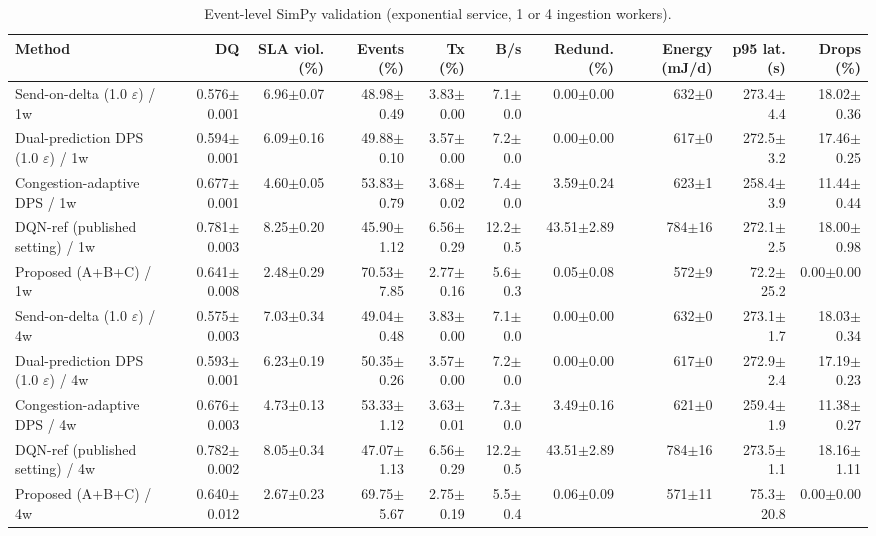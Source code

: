 \begin{table}[t]
\centering
\caption{Event-level SimPy validation (exponential service, 1 or 4 ingestion workers).}
\label{tab:simpy}
\footnotesize
\begin{tabular}{lrrrrrrrrr}
\toprule
Method & DQ & SLA viol. (\%) & Events (\%) & Tx (\%) & B/s & Redund. (\%) & Energy (mJ/d) & p95 lat. (s) & Drops (\%) \\
\midrule
Send-on-delta (1.0 $\varepsilon$) / 1w & 0.576$\pm$0.001 & 6.96$\pm$0.07 & 48.98$\pm$0.49 & 3.83$\pm$0.00 & 7.1$\pm$0.0 & 0.00$\pm$0.00 & 632$\pm$0 & 273.4$\pm$4.4 & 18.02$\pm$0.36 \\
Dual-prediction DPS (1.0 $\varepsilon$) / 1w & 0.594$\pm$0.001 & 6.09$\pm$0.16 & 49.88$\pm$0.10 & 3.57$\pm$0.00 & 7.2$\pm$0.0 & 0.00$\pm$0.00 & 617$\pm$0 & 272.5$\pm$3.2 & 17.46$\pm$0.25 \\
Congestion-adaptive DPS / 1w & 0.677$\pm$0.001 & 4.60$\pm$0.05 & 53.83$\pm$0.79 & 3.68$\pm$0.02 & 7.4$\pm$0.0 & 3.59$\pm$0.24 & 623$\pm$1 & 258.4$\pm$3.9 & 11.44$\pm$0.44 \\
DQN-ref (published setting) / 1w & 0.781$\pm$0.003 & 8.25$\pm$0.20 & 45.90$\pm$1.12 & 6.56$\pm$0.29 & 12.2$\pm$0.5 & 43.51$\pm$2.89 & 784$\pm$16 & 272.1$\pm$2.5 & 18.00$\pm$0.98 \\
Proposed (A+B+C) / 1w & 0.641$\pm$0.008 & 2.48$\pm$0.29 & 70.53$\pm$7.85 & 2.77$\pm$0.16 & 5.6$\pm$0.3 & 0.05$\pm$0.08 & 572$\pm$9 & 72.2$\pm$25.2 & 0.00$\pm$0.00 \\
Send-on-delta (1.0 $\varepsilon$) / 4w & 0.575$\pm$0.003 & 7.03$\pm$0.34 & 49.04$\pm$0.48 & 3.83$\pm$0.00 & 7.1$\pm$0.0 & 0.00$\pm$0.00 & 632$\pm$0 & 273.1$\pm$1.7 & 18.03$\pm$0.34 \\
Dual-prediction DPS (1.0 $\varepsilon$) / 4w & 0.593$\pm$0.001 & 6.23$\pm$0.19 & 50.35$\pm$0.26 & 3.57$\pm$0.00 & 7.2$\pm$0.0 & 0.00$\pm$0.00 & 617$\pm$0 & 272.9$\pm$2.4 & 17.19$\pm$0.23 \\
Congestion-adaptive DPS / 4w & 0.676$\pm$0.003 & 4.73$\pm$0.13 & 53.33$\pm$1.12 & 3.63$\pm$0.01 & 7.3$\pm$0.0 & 3.49$\pm$0.16 & 621$\pm$0 & 259.4$\pm$1.9 & 11.38$\pm$0.27 \\
DQN-ref (published setting) / 4w & 0.782$\pm$0.002 & 8.05$\pm$0.34 & 47.07$\pm$1.13 & 6.56$\pm$0.29 & 12.2$\pm$0.5 & 43.51$\pm$2.89 & 784$\pm$16 & 273.5$\pm$1.1 & 18.16$\pm$1.11 \\
Proposed (A+B+C) / 4w & 0.640$\pm$0.012 & 2.67$\pm$0.23 & 69.75$\pm$5.67 & 2.75$\pm$0.19 & 5.5$\pm$0.4 & 0.06$\pm$0.09 & 571$\pm$11 & 75.3$\pm$20.8 & 0.00$\pm$0.00 \\
\bottomrule
\end{tabular}
\end{table}
